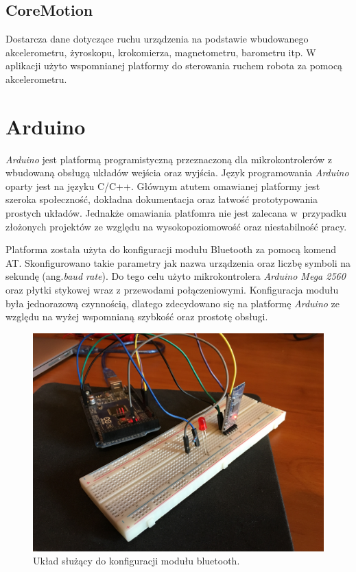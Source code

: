 \subsection{CoreMotion}
Dostarcza dane dotyczące ruchu urządzenia na podstawie wbudowanego akcelerometru, żyroskopu, krokomierza, magnetometru, barometru itp. W aplikacji użyto wspomnianej platformy do sterowania ruchem robota za pomocą akcelerometru.

\section{Arduino}
\textit{Arduino} jest platformą programistyczną przeznaczoną dla mikrokontrolerów z wbudowaną obsługą układów wejścia oraz wyjścia. Język programowania \textit{Arduino} oparty jest na języku C/C++. Głównym atutem omawianej platformy jest szeroka społeczność, dokładna dokumentacja oraz łatwość prototypowania prostych układów. Jednakże omawiania platfomra nie jest zalecana w~przypadku złożonych projektów ze względu na wysokopoziomowość oraz niestabilność pracy.

Platforma została użyta do konfiguracji modułu Bluetooth za pomocą komend AT. Skonfigurowano takie parametry jak nazwa urządzenia oraz liczbę symboli na sekundę (ang.\textit{baud rate}). Do tego celu użyto mikrokontrolera \textit{Arduino Mega 2560} oraz płytki stykowej wraz z przewodami połączeniowymi. Konfiguracja modułu była jednorazową czynnością, dlatego zdecydowano się na platformę \textit{Arduino} ze względu na wyżej wspomnianą szybkość oraz prostotę obsługi.
  

\begin{figure}[H]
	\centering
		\includegraphics[width=0.75\linewidth]{pic02/arduino.JPG}
	\caption{Układ służący do konfiguracji modułu bluetooth.}
	\label{fig:arduino}	
\end{figure}

